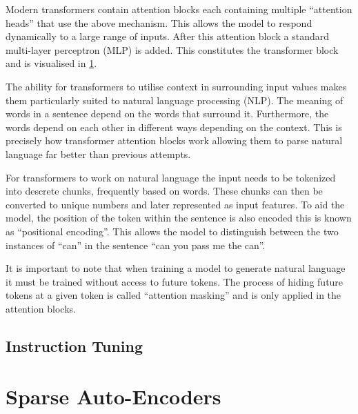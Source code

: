 Modern transformers contain attention blocks each containing multiple ``attention heads'' that use the above mechanism.
This allows the model to respond dynamically to a large range of inputs.
After this attention block a standard multi-layer perceptron (MLP) is added.
This constitutes the transformer block and is visualised in \ref{}.

The ability for transformers to utilise context in surrounding input values makes them particularly suited to natural language processing (NLP).
The meaning of words in a sentence depend on the words that surround it.
Furthermore, the words depend on each other in different ways depending on the context.
This is precisely how transformer attention blocks work allowing them to parse natural language far better than previous attempts.

For transformers to work on natural language the input needs to be tokenized into descrete chunks, frequently based on words.
These chunks can then be converted to unique numbers and later represented as input features.
To aid the model, the position of the token within the sentence is also encoded this is known as ``positional encoding''.
This allows the model to distinguish between the two instances of ``can'' in the sentence ``can you pass me the can''.

It is important to note that when training a model to generate natural language it must be trained without access to future tokens.
The process of hiding future tokens at a given token is called ``attention masking'' and is only applied in the attention blocks.

\subsection{Instruction Tuning}

\section{Sparse Auto-Encoders}
